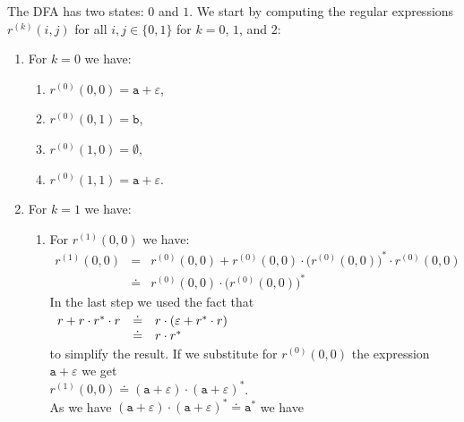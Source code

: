 \solutionEng
The \textsc{DFA} has two states: $0$ and $1$.  We start by computing the regular expressions
$r^{(k)}(i,j)$ for all $i,j\in\{0,1\}$ for  $k =0$, $1$, and $2$:
\begin{enumerate}
\item For $k = 0$ we have:
      \begin{enumerate}
      \item $r^{(0)}(0, 0) = \texttt{a} + \varepsilon$,
      \item $r^{(0)}(0, 1) = \texttt{b}$,
      \item $r^{(0)}(1, 0) = \emptyset$,
      \item $r^{(0)}(1, 1) = \texttt{a} + \varepsilon$.
      \end{enumerate}
\item For $k=1$ we have:
      \begin{enumerate}
      \item For $r^{(1)}(0, 0)$ we have:
            \begin{eqnarray*}
                  r^{(1)}(0, 0) 
            & = & r^{(0)}(0, 0) + 
                  r^{(0)}(0, 0) \cdot \bigl(r^{(0)}(0, 0)\bigr)^* \cdot r^{(0)}(0, 0) \\
            & \doteq & r^{(0)}(0, 0) \cdot \bigl(r^{(0)}(0, 0)\bigr)^*
            \end{eqnarray*}
             In the last step we used the fact that 
             \\[0.2cm]
             \hspace*{1.3cm}
             $
             \begin{array}[t]{lcl}
               r + r \cdot r^* \cdot r & \doteq & r \cdot (\varepsilon + r^* \cdot r) \\
                                       & \doteq & r \cdot r^*
             \end{array}
             $
             \\[0.2cm]
             to simplify the result.
             If we substitute for $r^{(0)}(0, 0)$ the expression $\texttt{a} + \varepsilon$  
             we get 
             \\[0.2cm]
             \hspace*{1.3cm}
             $r^{(1)}(0, 0) \doteq (\texttt{a} + \varepsilon)\cdot (\texttt{a} + \varepsilon)^*$.
             \\[0.2cm]
             As we have $(\texttt{a} + \varepsilon)\cdot (\texttt{a} + \varepsilon)^* \doteq \texttt{a}^*$ we have
             \\[0.2cm]

\end{enumerate}
\end{enumerate}
